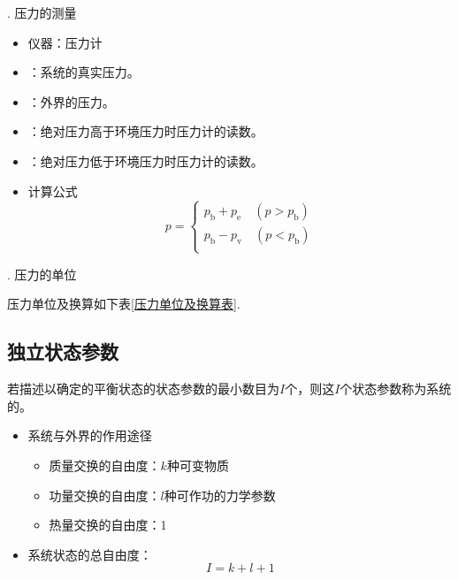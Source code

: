 . 压力的测量
\begin{itemize}
	\item 仪器：压力计
	\item {}：系统的真实压力。
	\item {}：外界的压力。
	\item {}：绝对压力高于环境压力时压力计的读数。
	\item {}：绝对压力低于环境压力时压力计的读数。
	\item 计算公式
	\begin{equation}
		p=
		\begin{cases}
			p_\text{b} + p_\text{e} \quad (p>p_\text{b})\\
			p_\text{b} - p_\text{v} \quad (p<p_\text{b})\\
		\end{cases}
	\end{equation}
\end{itemize}

. 压力的单位

压力单位及换算如下表\ref{压力单位及换算表}.
\begin{table}[!htb]
	\centering
\caption{压力单位及换算表}
\label{压力单位及换算表}
\end{table}

\subsection{独立状态参数}
\tdefination[独立状态参数]
若描述以确定的平衡状态的状态参数的最小数目为$I$个，则这$I$个状态参数称为系统的。

\begin{itemize}
	\item 系统与外界的作用途径
	\begin{itemize}
		\item 质量交换的自由度：$k$种可变物质
		\item 功量交换的自由度：$l$种可作功的力学参数
		\item 热量交换的自由度：1
	\end{itemize}
	\item 系统状态的总自由度：
	\begin{equation}
		I=k+l+1
	\end{equation}
\end{itemize}

